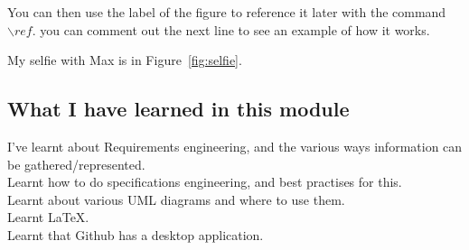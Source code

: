 You can then use the label of the figure to reference it later with the command ${\backslash}ref$. you can comment out the next line to see an example of how it works.

My selfie with Max is in  Figure~\ref{fig:selfie}.

\subsection{What I have learned in this module}
I've learnt about Requirements engineering, and the various ways information can be gathered/represented.\\ 
Learnt how to do specifications engineering, and best practises for this.\\
Learnt about various UML diagrams and where to use them.\\
Learnt LaTeX.\\
Learnt that Github has a desktop application.\\

